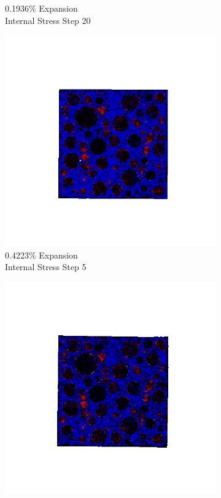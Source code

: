 \begin{figure}[ht!]
\begin{subfigure}{.25\textwidth}
      \caption{0.1936\% Expansion\\Internal Stress Step 20}
    \end{subfigure}

    \begin{subfigure}{.25\textwidth}
      \centering
      \includegraphics[width=1.0\linewidth]{Files/exp_3D/ASR/A30P75_3_s5.png}
      \caption{0.4223\% Expansion\\Internal Stress Step 5}
    \end{subfigure}%
    \begin{subfigure}{.25\textwidth}
      \centering
      \includegraphics[width=1.0\linewidth]{Files/exp_3D/ASR/A30P75_3_s10.png}

\end{subfigure}
\end{figure}
